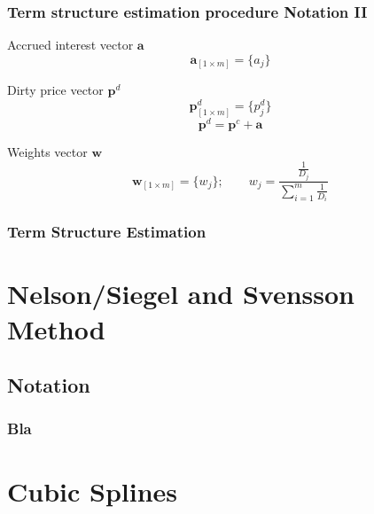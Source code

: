 \documentclass[mathserif,10pt]{beamer}
\begin{document}
\begin{frame}
	\frametitle{Term structure estimation procedure \newline Notation II}
	\begin{beamerboxesrounded}[shadow=true]{Accrued interest vector $\bm{a}$}
		\begin{equation*}\label{a}
		\bm{a}_{\left[1\times m\right]} = \{a_j\}
		\end{equation*}
	\end{beamerboxesrounded}
	\vspace{0.2cm}
	\begin{beamerboxesrounded}[shadow=true]{Dirty price vector $\bm{p}^d$}
		\begin{equation*}\label{pd}
   		\bm{p}^d_{\left[1\times m\right]}= \{p^d_j\}
		\end{equation*}
		\begin{displaymath}
		\bm{p}^d=\bm{p}^c+\bm{a}
		\end{displaymath}
	\end{beamerboxesrounded}
	\vspace{0.2cm}
	\begin{beamerboxesrounded}[shadow=true]{Weights vector $\bm{w}$}
		\begin{equation*}\label{weights}
   		\bm{w}_{\left[1\times m\right]}= \{w_j\}; \qquad   w_j=\frac{\frac{1}{D_j}}{\sum_{i=1}^m\frac{1}{D_i}}
		\end{equation*}
	\end{beamerboxesrounded}	
\end{frame}

\begin{frame} \frametitle{Term Structure Estimation}
  
\end{frame}


\section{Nelson/Siegel and Svensson Method}
\subsection{Notation}

\begin{frame} \frametitle{Bla}
\end{frame}


\section{Cubic Splines}
\end{document}
